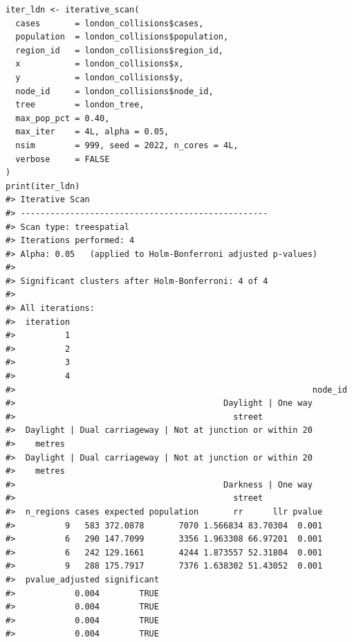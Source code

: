 \begin{verbatim}
iter_ldn <- iterative_scan(
  cases       = london_collisions$cases,
  population  = london_collisions$population,
  region_id   = london_collisions$region_id,
  x           = london_collisions$x,
  y           = london_collisions$y,
  node_id     = london_collisions$node_id,
  tree        = london_tree,
  max_pop_pct = 0.40,
  max_iter    = 4L, alpha = 0.05,
  nsim        = 999, seed = 2022, n_cores = 4L,
  verbose     = FALSE
)
print(iter_ldn)
#> Iterative Scan
#> -------------------------------------------------- 
#> Scan type: treespatial 
#> Iterations performed: 4 
#> Alpha: 0.05   (applied to Holm-Bonferroni adjusted p-values)
#> 
#> Significant clusters after Holm-Bonferroni: 4 of 4
#> 
#> All iterations:
#>  iteration
#>          1
#>          2
#>          3
#>          4
#>                                                            node_id
#>                                          Daylight | One way
#>                                            street
#>  Daylight | Dual carriageway | Not at junction or within 20
#>    metres
#>  Daylight | Dual carriageway | Not at junction or within 20
#>    metres
#>                                          Darkness | One way
#>                                            street
#>  n_regions cases expected population       rr      llr pvalue
#>          9   583 372.0878       7070 1.566834 83.70304  0.001
#>          6   290 147.7099       3356 1.963308 66.97201  0.001
#>          6   242 129.1661       4244 1.873557 52.31804  0.001
#>          9   288 175.7917       7376 1.638302 51.43052  0.001
#>  pvalue_adjusted significant
#>            0.004        TRUE
#>            0.004        TRUE
#>            0.004        TRUE
#>            0.004        TRUE
\end{verbatim}

